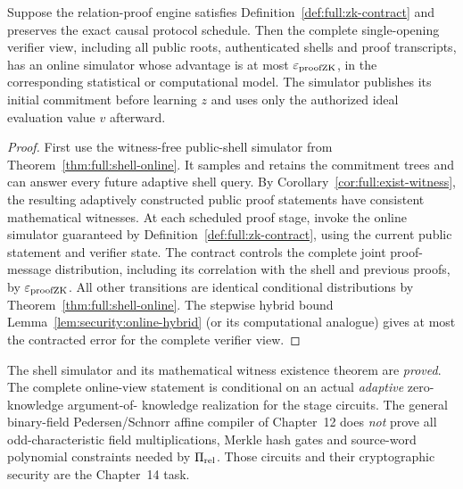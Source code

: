 \begin{theorem}\label{thm:full:conditional-online}
Suppose the relation-proof engine
satisfies
Definition~\ref{def:full:zk-contract}
and preserves the exact causal
protocol schedule.
Then the complete single-opening
verifier view, including all
public roots, authenticated
shells and proof transcripts,
has an online simulator whose
advantage is at most
$\varepsilon_{\rm proofZK}$,
in the corresponding statistical
or computational model.
The simulator publishes its
initial commitment before
learning $z$ and uses only
the authorized ideal evaluation
value $v$ afterward.
\end{theorem}
\begin{proof}
First use the witness-free
public-shell simulator from
Theorem~\ref{thm:full:shell-online}.
It samples and retains
the commitment trees and
can answer every future
adaptive shell query.
By Corollary~\ref{cor:full:exist-witness},
the resulting adaptively
constructed public proof
statements have consistent
mathematical witnesses.
At each scheduled proof stage,
invoke the online simulator
guaranteed by
Definition~\ref{def:full:zk-contract},
using the current public
statement and verifier state.
The contract controls the
complete joint proof-message
distribution, including its
correlation with the shell
and previous proofs, by
$\varepsilon_{\rm proofZK}$.
All other transitions are
identical conditional
distributions by
Theorem~\ref{thm:full:shell-online}.
The stepwise hybrid bound
Lemma~\ref{lem:security:online-hybrid}
(or its computational analogue)
gives at most the contracted
error for the complete
verifier view.
\end{proof}

\begin{remark}
The shell simulator and
its mathematical witness
existence theorem are
\emph{proved}. The complete
online-view statement
is conditional on an
actual \emph{adaptive}
zero-knowledge argument-of-
knowledge realization for
the stage circuits.
The general binary-field
Pedersen/Schnorr affine
compiler of Chapter~12
does \emph{not} prove all
odd-characteristic field
multiplications, Merkle
hash gates and source-word
polynomial constraints
needed by $\Pi_{\rm rel}$.
Those circuits and their
cryptographic security
are the Chapter~14 task.
\end{remark}
